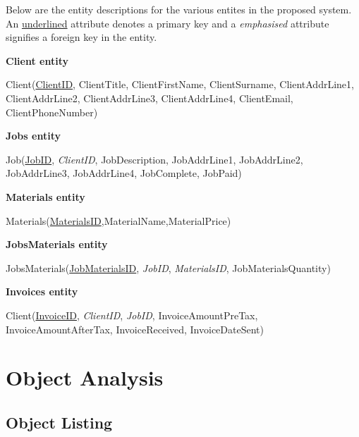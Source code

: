 \begin{flushleft}

Below are the entity descriptions for the various entites in the proposed system. An \underline{underlined} attribute denotes a primary key and a \emph{emphasised}	attribute signifies a foreign key in the entity.

\end{flushleft}


\textbf{Client entity}

\begin{center}
	Client(\underline{ClientID}, ClientTitle, ClientFirstName, ClientSurname, ClientAddrLine1, ClientAddrLine2, ClientAddrLine3, ClientAddrLine4, ClientEmail, ClientPhoneNumber)
\end{center}

\textbf{Jobs entity}

\begin{center}
Job(\underline{JobID}, \emph{ClientID}, JobDescription, JobAddrLine1, JobAddrLine2, JobAddrLine3, JobAddrLine4, JobComplete, JobPaid)
\end{center}

\textbf{Materials entity}

\begin{center}
Materials(\underline{MaterialsID},MaterialName,MaterialPrice)
\end{center}

\textbf{JobsMaterials entity}

\begin{center}
JobsMaterials(\underline{JobMaterialsID}, \emph{JobID}, \emph{MaterialsID}, JobMaterialsQuantity)
\end{center}

\textbf{Invoices entity}

\begin{center}
Client(\underline{InvoiceID}, \emph{ClientID}, \emph{JobID}, InvoiceAmountPreTax, InvoiceAmountAfterTax, InvoiceReceived, InvoiceDateSent)
\end{center}




\section{Object Analysis}

\subsection{Object Listing}

